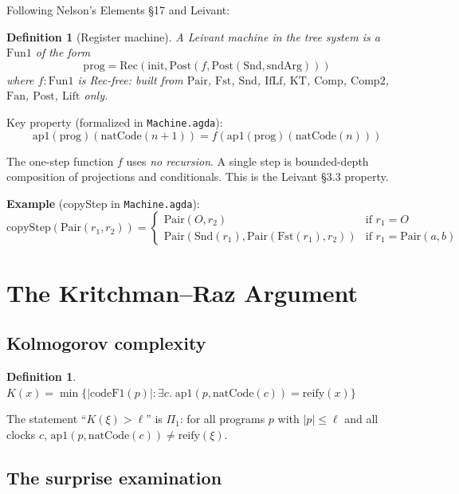 \documentclass[11pt]{article}
\newtheorem{definition}[theorem]{Definition}
\begin{document}
Following Nelson's Elements \S17 and Leivant:

\begin{definition}[Register machine]
A \emph{Leivant machine} in the tree system is a $\mathrm{Fun1}$ of the form
$$\mathrm{prog} = \mathrm{Rec}(\mathrm{init}, \mathrm{Post}(f, \mathrm{Post}(\mathrm{Snd}, \mathrm{sndArg})))$$
where $f : \mathrm{Fun1}$ is \emph{Rec-free}: built from $\mathrm{Pair}$, $\mathrm{Fst}$, $\mathrm{Snd}$, $\mathrm{IfLf}$, $\mathrm{KT}$, $\mathrm{Comp}$, $\mathrm{Comp2}$, $\mathrm{Fan}$, $\mathrm{Post}$, $\mathrm{Lift}$ only.
\end{definition}

Key property (formalized in \texttt{Machine.agda}):
$$\mathrm{ap1}(\mathrm{prog})(\mathrm{natCode}(n+1)) = f(\mathrm{ap1}(\mathrm{prog})(\mathrm{natCode}(n)))$$

The one-step function $f$ uses \emph{no recursion}. A single step is bounded-depth composition of projections and conditionals. This is the Leivant \S3.3 property.

\textbf{Example} (copyStep in \texttt{Machine.agda}):
$$\mathrm{copyStep}(\mathrm{Pair}(r_1, r_2)) = \begin{cases}
\mathrm{Pair}(O, r_2) & \text{if } r_1 = O \\
\mathrm{Pair}(\mathrm{Snd}(r_1), \mathrm{Pair}(\mathrm{Fst}(r_1), r_2)) & \text{if } r_1 = \mathrm{Pair}(a,b)
\end{cases}$$

\section{The Kritchman--Raz Argument}

\subsection{Kolmogorov complexity}

\begin{definition}
$K(x) = \min\{|\mathrm{codeF1}(p)| : \exists c.\; \mathrm{ap1}(p, \mathrm{natCode}(c)) = \mathrm{reify}(x)\}$
\end{definition}

The statement ``$K(\xi) > \ell$'' is $\Pi_1$: for all programs $p$ with $|p| \le \ell$ and all clocks $c$, $\mathrm{ap1}(p, \mathrm{natCode}(c)) \ne \mathrm{reify}(\xi)$.

\subsection{The surprise examination}
\end{document}

